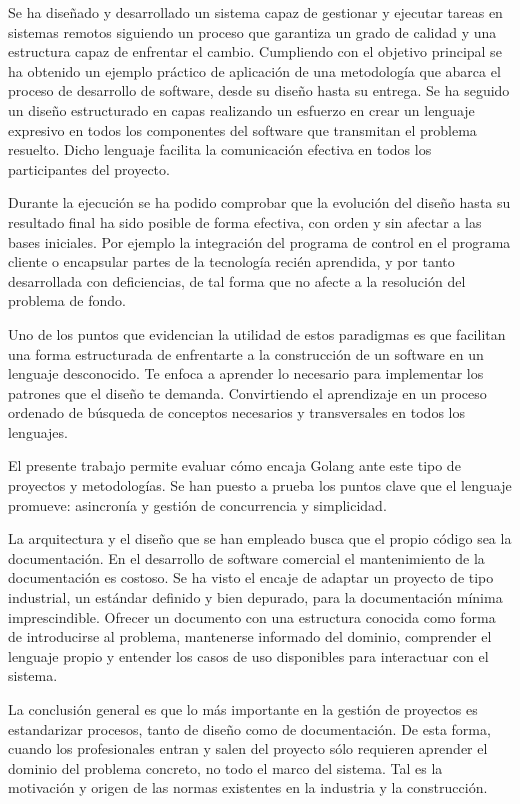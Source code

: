 Se ha diseñado y desarrollado un sistema capaz de gestionar y ejecutar tareas en sistemas remotos siguiendo un proceso que garantiza un grado de calidad y una estructura capaz de enfrentar el cambio.
Cumpliendo con el objetivo principal se ha obtenido un ejemplo práctico de aplicación de una metodología que abarca el proceso de desarrollo de software, desde su diseño hasta su entrega.
Se ha seguido un diseño estructurado en capas realizando un esfuerzo en crear un lenguaje expresivo en todos los componentes del software que transmitan el problema resuelto.
Dicho lenguaje facilita la comunicación efectiva en todos los participantes del proyecto.

Durante la ejecución se ha podido comprobar que la evolución del diseño hasta su resultado final ha sido posible de forma efectiva, con orden y sin afectar a las bases iniciales.
Por ejemplo la integración del programa de control en el programa cliente o encapsular partes de la tecnología recién aprendida, y por tanto desarrollada con deficiencias, de tal forma que no afecte a la resolución del problema de fondo.

Uno de los puntos que evidencian la utilidad de estos paradigmas es que facilitan una forma estructurada de enfrentarte a la construcción de un software en un lenguaje desconocido.
Te enfoca a aprender lo necesario para implementar los patrones que el diseño te demanda.
Convirtiendo el aprendizaje en un proceso ordenado de búsqueda de conceptos necesarios y transversales en todos los lenguajes.

El presente trabajo permite evaluar cómo encaja Golang ante este tipo de proyectos y metodologías.
Se han puesto a prueba los puntos clave que el lenguaje promueve: asincronía y gestión de concurrencia y simplicidad.

La arquitectura y el diseño que se han empleado busca que el propio código sea la documentación.
En el desarrollo de software comercial el mantenimiento de la documentación es costoso.
Se ha visto el encaje de adaptar un proyecto de tipo industrial, un estándar definido y bien depurado, para la documentación mínima imprescindible.
Ofrecer un documento con una estructura conocida como forma de introducirse al problema, mantenerse informado del dominio, comprender el lenguaje propio y entender los casos de uso disponibles para interactuar con el sistema.

La conclusión general es que lo más importante en la gestión de proyectos es estandarizar procesos, tanto de diseño como de documentación.
De esta forma, cuando los profesionales entran y salen del proyecto sólo requieren aprender el dominio del problema concreto, no todo el marco del sistema.
Tal es la motivación y origen de las normas existentes en la industria y la construcción.

